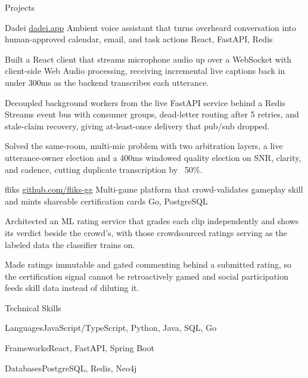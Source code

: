\documentclass[
	11pt
]{../../../template}
\begin{document}
	\begin{rSection}{P}{rojects}
		\begin{rSectionEntry}
			{Dadei}
			{\href{https://dadei.app}{dadei.app}}
			{Ambient voice assistant that turns overheard conversation into human-approved calendar, email, and task actions}
			{React, FastAPI, Redis}
			{}

			\item Built a React client that streams microphone audio up over a WebSocket with client-side Web Audio processing, receiving incremental live captions back in under 300ms as the backend transcribes each utterance.
			\item Decoupled background workers from the live FastAPI service behind a Redis Streams event bus with consumer groups, dead-letter routing after 5 retries, and stale-claim recovery, giving at-least-once delivery that pub/sub dropped.
			\item Solved the same-room, multi-mic problem with two arbitration layers, a live utterance-owner election and a 400ms windowed quality election on SNR, clarity, and cadence, cutting duplicate transcription by ~50\%.
		\end{rSectionEntry}

		\begin{rSectionEntry}
			{fliks}
			{\href{https://github.com/fliks-gg}{github.com/fliks-gg}}
			{Multi-game platform that crowd-validates gameplay skill and mints shareable certification cards}
			{Go, PostgreSQL}
			{}

			\item Architected an ML rating service that grades each clip independently and shows its verdict beside the crowd's, with those crowdsourced ratings serving as the labeled data the classifier trains on.
			\item Made ratings immutable and gated commenting behind a submitted rating, so the certification signal cannot be retroactively gamed and social participation feeds skill data instead of diluting it.
		\end{rSectionEntry}
	\end{rSection}

	\begin{rSection}{T}{echnical Skills}
		\begin{rSet}{Languages}{JavaScript/TypeScript, Python, Java, SQL, Go}
		\end{rSet}
		\begin{rSet}{Frameworks}{React, FastAPI, Spring Boot}
		\end{rSet}
		\begin{rSet}{Databases}{PostgreSQL, Redis, Neo4j}
		\end{rSet}
	\end{rSection}
\end{document}
